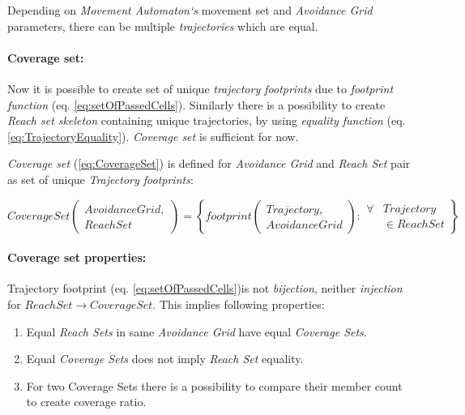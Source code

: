 \begin{note}
    Depending on \emph{Movement Automaton`s} movement set and \emph{Avoidance Grid} parameters, there can be multiple \emph{trajectories} which are equal.
\end{note}

\paragraph{Coverage set:} Now it is possible to create set of unique \emph{trajectory footprints} due to \emph{footprint function} (eq. \ref{eq:setOfPassedCells}). Similarly there is a possibility to create \emph{Reach set skeleton} containing unique trajectories, by using 
\emph{equality function} (eq. \ref{eq:TrajectoryEquality}).
\emph{Coverage set} is sufficient for now.

\newpage
\begin{definition}\label{def:CoverageSet}
    \emph{Coverage set} (\ref{eq:CoverageSet}) is defined for \emph{Avoidance Grid} and \emph{Reach Set} pair as set of unique \emph{Trajectory footprints}:
    
    \begin{equation}\label{eq:CoverageSet}
        CoverageSet\left(\begin{gathered}AvoidanceGrid,\\ReachSet\end{gathered}\right)= \left\{
            footprint\left(\begin{gathered}     
                Trajectory,\\AvoidanceGrid
            \end{gathered}\right):
            \begin{aligned}
                \forall &Trajectory\\ &\in Reach Set
            \end{aligned}\right\}
    \end{equation}
\end{definition}

\paragraph{Coverage set properties:} Trajectory footprint (eq. \ref{eq:setOfPassedCells})is not \emph{bijection}, neither \emph{injection} for $ReachSet \to CoverageSet$. This implies following properties:

\begin{enumerate}
    \item Equal \emph{Reach Sets} in same \emph{Avoidance Grid} have equal \emph{Coverage Sets}.
    
    \item Equal \emph{Coverage Sets} does not imply \emph{Reach Set} equality.
    
    \item For two {Coverage Sets} there is a possibility to compare their member count to create coverage ratio.
\end{enumerate}


